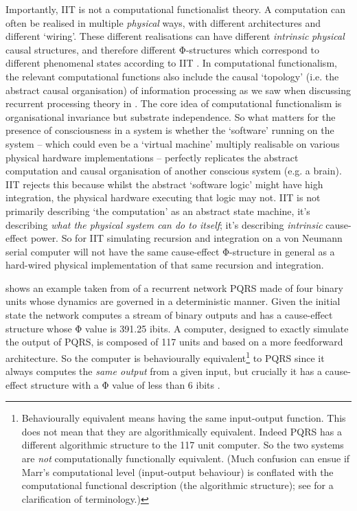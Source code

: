 \documentclass[11pt, a4paper, onecolumn, gdm]{google}
\begin{document}
Importantly, IIT is not a computational functionalist theory.
A computation can often be realised in multiple \emph{physical} ways, with different architectures and different `wiring'.
These different realisations can have different \emph{intrinsic} \emph{physical} causal structures, and therefore different Φ-structures which correspond to different phenomenal states according to IIT \citep{tononi2015}.
In computational functionalism, the relevant computational functions also include the causal `topology' (i.e. the abstract causal organisation) of information processing as we saw when discussing recurrent processing theory in .
The core idea of computational functionalism is organisational invariance but substrate independence.
So what matters for the presence of consciousness in a system is whether the `software' running on the system -- which could even be a `virtual machine' multiply realisable on various physical hardware implementations -- perfectly replicates the abstract computation and causal organisation of another conscious system (e.g. a brain).
IIT rejects this because whilst the abstract `software logic' might have high integration, the physical hardware executing that logic may not.
IIT is not primarily describing `the computation' as an abstract state machine, it's describing \emph{what the physical system can do to itself}; it's describing \emph{intrinsic} cause-effect power.
So for IIT simulating recursion and integration on a von Neumann serial computer will not have the same cause-effect Φ-structure in general as a hard-wired physical implementation of that same recursion and integration.

 shows an example taken from \citet{findlay2024} of a recurrent network PQRS made of four binary units whose dynamics are governed in a deterministic manner.
Given the initial state the network computes a stream of binary outputs and has a cause-effect structure whose Φ value is 391.25 ibits.
A computer, designed to exactly simulate the output of PQRS, is composed of 117 units and based on a more feedforward architecture.
So the computer is behaviourally equivalent\footnote{Behaviourally equivalent means having the same input-output function. This does not mean that they are algorithmically equivalent. Indeed PQRS has a different algorithmic structure to the 117 unit computer. So the two systems are \emph{not} computationally functionally equivalent. (Much confusion can ensue if Marr's computational level (input-output behaviour) is conflated with the computational functional description (the algorithmic structure); see  for a clarification of terminology.)} to PQRS since it always computes the \emph{same output} from a given input, but crucially it has a cause-effect structure with a Φ value of less than 6 ibits \citetext{see also \citealp{li2025} for other studies on transformers using IIT principles}.
\end{document}
